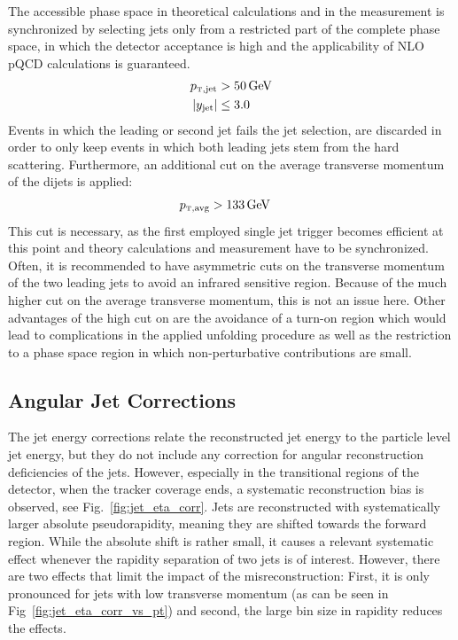 The accessible phase space in theoretical calculations and in the measurement is
synchronized by selecting jets only from a restricted part of the complete phase
space, in which the detector acceptance is high and the applicability of NLO
pQCD calculations is guaranteed.
%
\begin{align*}
    \ptjet &> \SI{50}{\GeV}\\
    |y_\mathrm{jet}| &\leq 3.0\\
\end{align*}
%
Events in which the leading or second jet fails the jet selection, are
discarded in order to only keep events in which both leading jets stem
from the hard scattering. Furthermore, an additional cut on the
average transverse momentum of the dijets is applied:
%
\begin{align*}
    \ptavg &> \SI{133}{\GeV}
\end{align*}
%
This cut is necessary, as the first employed single jet trigger becomes
efficient at this point and theory calculations and measurement have to be
synchronized. Often, it is recommended to have asymmetric cuts on the
transverse momentum of the two leading jets to avoid an infrared sensitive
region. Because of the much higher cut on the average transverse momentum, this
is not an issue here. Other advantages of the high cut on \ptavg are the
avoidance of a turn-on region which would lead to complications in the applied
unfolding procedure as well as the restriction to a phase space region in which
non-perturbative contributions are small.

\subsection{Angular Jet Corrections}

The jet energy corrections relate the reconstructed jet energy to the particle
level jet energy, but they do not include any correction for angular
reconstruction deficiencies of the jets. However, especially in the transitional
regions of the detector, \ie when the tracker coverage ends, a systematic
reconstruction bias is observed, see Fig.~\ref{fig:jet_eta_corr}. Jets are
reconstructed with systematically larger absolute pseudorapidity, meaning they
are shifted towards the forward region. While the absolute shift is rather
small, it causes a relevant systematic effect whenever the rapidity separation
of two jets is of interest. However, there are two effects that limit the impact of the
misreconstruction: First, it is only pronounced for jets with low transverse momentum
(as can be seen in Fig~\ref{fig:jet_eta_corr_vs_pt}) and second, the large bin
size in rapidity reduces the effects. 

